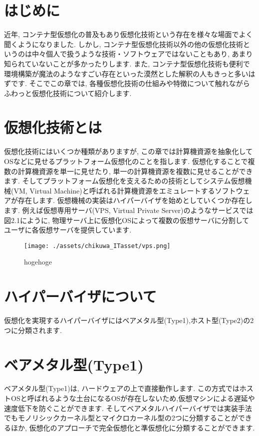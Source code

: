 \section{はじめに}
近年, コンテナ型仮想化の普及もあり仮想化技術という存在を様々な場面でよく聞くようになりました. しかし, コンテナ型仮想化技術以外の他の仮想化技術というのは中々個人で扱うような技術・ソフトウェアではないこともあり, あまり知られていないことが多かったりします. また, コンテナ型仮想化技術も便利で環境構築が魔法のようなすごい存在といった漠然とした解釈の人もきっと多いはずです. そこでこの章では, 各種仮想化技術の仕組みや特徴について触れながらふわっと仮想化技術について紹介します.

\section{仮想化技術とは}
仮想化技術にはいくつか種類がありますが, この章では計算機資源を抽象化してOSなどに見せるプラットフォーム仮想化のことを指します. 仮想化することで複数の計算機資源を単一に見せたり, 単一の計算機資源を複数に見せることができます. そしてプラットフォーム仮想化を支えるための技術としてシステム仮想機械(VM, Virtual Machine)と呼ばれる計算機資源をエミュレートするソフトウェアが存在します. 仮想機械の実装はハイパーバイザを始めとしていくつか存在します. 例えば仮想専用サーバ(VPS, Virtual Private Server)のようなサービスでは図2.1にように, 物理サーバ上に仮想化OSによって複数の仮想サーバに分割してユーザに各仮想サーバを提供しています.
\begin{figure}[htbp]
    \centering
    \texttt{[image: ./assets/chikuwa\_ITasset/vps.png]}
    \caption{hogehoge}
    \label{fig:vps}
\end{figure}

\section{ハイパーバイザについて}
仮想化を実現するハイパーバイザにはベアメタル型(Type1),ホスト型(Type2)の2つに分類されます.

\section{ベアメタル型(Type1)}
ベアメタル型(Type1)は, ハードウェアの上で直接動作します. この方式ではホストOSと呼ばれるような土台になるOSが存在しないため,仮想マシンによる遅延や速度低下を防ぐことができます. そしてベアメタルハイパーバイザでは実装手法でもモノリシックカーネル型とマイクロカーネル型の2つに分類することができるほか, 仮想化のアプローチで完全仮想化と準仮想化に分類することができます.
